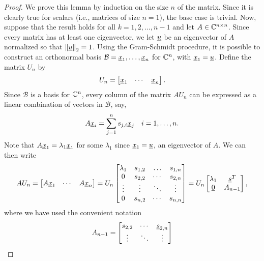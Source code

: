 \begin{proof}
We prove this lemma by induction on the size $n$ of the matrix.
Since it is clearly true for scalars (i.e., matrices of size $n=1$), the base case is trivial.
Now, suppose that the result holds for all $k=1,2,\ldots,n-1$ and let $A \in \mathbb{C}^{n \times n}$.
Since every matrix has at least one eigenvector, we let $\underline{u}$ be an eigenvector of $A$ normalized so that $\left\| \underline{u} \right\|_2 = 1$.
Using the Gram-Schmidt procedure, it is possible to construct an orthonormal basis $\mathcal{B} = \underline{x}_1, \ldots, \underline{x}_n$ for $\mathbb{C}^n$, with $\underline{x}_1 = \underline{u}$.
Define the matrix $U_n$ by
\begin{equation*}
U_n = \begin{bmatrix} \underline{x}_1 & \cdots & \underline{x}_n \end{bmatrix} .
\end{equation*}
Since $\mathcal{B}$ is a basis for $\mathbb{C}^n$, every column of the matrix $AU_n$ can be expressed as a linear combination of vectors in $\mathcal{B}$, say,
\begin{equation*}
A \underline{x}_i = \sum_{j=1}^n s_{j,i} \underline{x}_j
\quad i = 1, \ldots, n .
\end{equation*}
Note that $A \underline{x}_1 = \lambda_1 \underline{x}_1$ for some $\lambda_1$ since $\underline{x}_1 = \underline{u}$, an eigenvector of $A$.
We can then write
\begin{equation*}
A U_n = \begin{bmatrix} A \underline{x}_1 & \cdots & A \underline{x}_n \end{bmatrix}
= U_n \begin{bmatrix} \lambda_1 & s_{1,2} & \ldots & s_{1,n} \\
0 & s_{2,2} & \cdots & s_{2,n} \\
\vdots & \vdots & \ddots & \vdots \\
0 & s_{n,2} & \cdots & s_{n,n} \end{bmatrix}
= U_n \begin{bmatrix} \lambda_1 & \underline{s}^T \\
\underline{0} & A_{n-1} \end{bmatrix} ,
\end{equation*}
where we have used the convenient notation
\begin{equation*}
A_{n-1} = \begin{bmatrix} s_{2,2} & \cdots & \underline{s}_{2,n} \\
\vdots & \ddots & \vdots \\

\end{bmatrix}
\end{equation*}
\end{proof}
